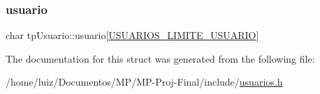 \mbox{\label{structtpUsuario_a9c879decf8352b2665264210b50d16a0}} 
\subsubsection{\texorpdfstring{usuario}{usuario}}
{\footnotesize\ttfamily char tp\+Usuario\+::usuario\mbox{[}\hyperlink{usuarios_8h_a8643d53df87a8395a3665ebc203d9277}{U\+S\+U\+A\+R\+I\+O\+S\+\_\+\+L\+I\+M\+I\+T\+E\+\_\+\+U\+S\+U\+A\+R\+IO}\mbox{]}}



The documentation for this struct was generated from the following file\+:\begin{DoxyCompactItemize}
\item 
/home/luiz/\+Documentos/\+M\+P/\+M\+P-\/\+Proj-\/\+Final/include/\hyperlink{usuarios_8h}{usuarios.\+h}\end{DoxyCompactItemize}
